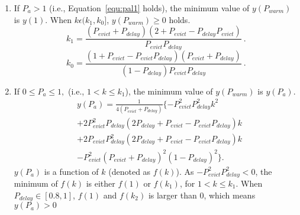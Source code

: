\begin{enumerate}


  \item If $P_{a} > 1$ (i.e., Equation~\ref{equ:pal1} holds), the minimum value of $y(P_{warm})$ is $y(1)$.
  When $k \epsilon (k_{1}, k_{0}]$, $y(P_{warm}) \geq 0$ holds.
    \begin{equation}
    \label{equ:pal1}
     k_{1} = \frac{(P_{evict}+P_{delay})(2+P_{evict}-P_{delay}P_{evict})}{P_{evict}P_{delay}} \ .
  \end{equation}
  \begin{equation}
   k_{0} = \frac{(1 + P_{evict}- P_{evict}P_{delay})(P_{evict}+P_{delay})}{(1 - P_{delay})P_{evict}P_{delay}}\ .
  \end{equation}


  \item If $0 \leq P_{a} \leq 1,$ (i.e., $1 < k \leq k_{1}$), the minimum value of $y(P_{warm})$ is $y(P_{a})$.
  \begin{equation}\begin{split}
    &y(P_{a}) = \frac{1}{4(P_{evict}+P_{delay})}\{-P_{evict}^{2}P_{delay}^{2}k^{2}\\
    &+ 2P_{evict}^{2}P_{delay}(2P_{delay}+P_{evict}-P_{evict}P_{delay})k\\
    &+ 2P_{evict}P_{delay}^{2}(2P_{delay}+P_{evict}-P_{evict}P_{delay})k\\
    & - P_{evict}^{2}(P_{evict}+P_{delay})^{2}(1-P_{delay})^{2}\}.
  \end{split}\end{equation}
 $y(P_{a})$ is a function of $k$ (denoted as $f(k)$). As $-P_{evict}^{2}P_{delay}^{2} < 0$, the minimum of $f(k)$ is either $f(1)$ or $f(k_{1})$, for $1 < k \leq k_{1}$. When $P_{delay} \in [0.8,1]$, $f(1)$ and  $f(k_{2})$ is larger than $0$, which means $y(P_{a}) > 0$


\end{enumerate}

